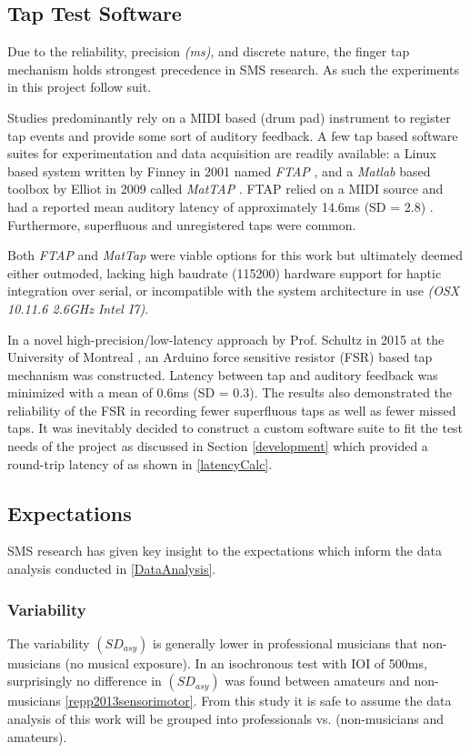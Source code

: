 \subsection{Tap Test Software} \label{ttsw}
Due to the reliability, precision \textit{(ms)}, and discrete nature, the finger tap mechanism holds strongest precedence in SMS research. As such the experiments in this project follow suit. 

Studies predominantly rely on a MIDI based (drum pad) instrument to register tap events and provide some sort of auditory feedback. A few tap based software suites for experimentation and data acquisition are readily available: a Linux based system written by Finney in 2001 named \textit{FTAP} \cite{finney2001ftap}, and a \textit{Matlab} based toolbox by Elliot in 2009 called \textit{MatTAP} \cite{elliott2009mattap}. FTAP relied on a MIDI source and had a reported mean auditory latency of approximately 14.6ms (SD = 2.8) \cite{schultz2016tap}. Furthermore, superfluous and unregistered taps were common.

Both \textit{FTAP} and \textit{MatTap} were viable options for this work but ultimately deemed either outmoded, lacking high baudrate (115200) hardware support for haptic integration over serial, or incompatible with the system architecture in use \textit{(OSX 10.11.6 2.6GHz Intel I7)}.

In a novel high-precision/low-latency approach by Prof. Schultz in 2015 at the University of Montreal \cite{schultz2016tap}, an Arduino force sensitive resistor (FSR) based tap mechanism was constructed. Latency between tap and auditory feedback was minimized with a mean of 0.6ms (SD = 0.3). The results also demonstrated the reliability of the FSR in recording fewer superfluous taps as well as fewer missed taps.
It was inevitably decided to construct a custom software suite to fit the test needs of the project as discussed in Section \ref{development} which provided a round-trip latency of 
as shown in \ref{latencyCalc}.

\subsection{Expectations} \label{SMSFindings}
SMS research has given key insight to the expectations which inform the data analysis conducted in \ref{DataAnalysis}.

\subsubsection{Variability}
The variability $(SD_{asy})$ is generally lower in professional musicians that non-musicians (no musical exposure). In an isochronous test with IOI of 500ms, surprisingly no difference in $(SD_{asy})$ was found between amateurs and non-musicians \ref{repp2013sensorimotor}. From this study it is safe to assume the data analysis of this work will be grouped into professionals vs. (non-musicians and amateurs).


